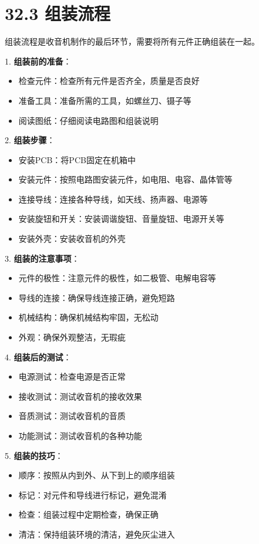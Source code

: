 \documentclass[12pt,UTF8]{ctexbook}
\begin{document}
\section*{32.3 组装流程}

组装流程是收音机制作的最后环节，需要将所有元件正确组装在一起。

1. \textbf{组装前的准备}：
   \begin{itemize}[leftmargin=3.5em]
   \item 检查元件：检查所有元件是否齐全，质量是否良好
   \item 准备工具：准备所需的工具，如螺丝刀、镊子等
   \item 阅读图纸：仔细阅读电路图和组装说明
   \end{itemize}

2. \textbf{组装步骤}：
   \begin{itemize}[leftmargin=3.5em]
   \item 安装PCB：将PCB固定在机箱中
   \item 安装元件：按照电路图安装元件，如电阻、电容、晶体管等
   \item 连接导线：连接各种导线，如天线、扬声器、电源等
   \item 安装旋钮和开关：安装调谐旋钮、音量旋钮、电源开关等
   \item 安装外壳：安装收音机的外壳
   \end{itemize}

3. \textbf{组装的注意事项}：
   \begin{itemize}[leftmargin=3.5em]
   \item 元件的极性：注意元件的极性，如二极管、电解电容等
   \item 导线的连接：确保导线连接正确，避免短路
   \item 机械结构：确保机械结构牢固，无松动
   \item 外观：确保外观整洁，无瑕疵
   \end{itemize}

4. \textbf{组装后的测试}：
   \begin{itemize}[leftmargin=3.5em]
   \item 电源测试：检查电源是否正常
   \item 接收测试：测试收音机的接收效果
   \item 音质测试：测试收音机的音质
   \item 功能测试：测试收音机的各种功能
   \end{itemize}

5. \textbf{组装的技巧}：
   \begin{itemize}[leftmargin=3.5em]
   \item 顺序：按照从内到外、从下到上的顺序组装
   \item 标记：对元件和导线进行标记，避免混淆
   \item 检查：组装过程中定期检查，确保正确
   \item 清洁：保持组装环境的清洁，避免灰尘进入
   \end{itemize}
\end{document}
